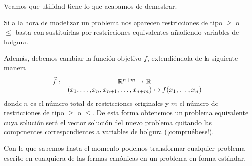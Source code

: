 Veamos que utilidad tiene lo que acabamos de demostrar.
\begin{obs}[Aplicación]
	Si a la hora de modelizar un problema nos aparecen restricciones de tipo $\geq$ o $\leq$ basta con sustituirlas por restricciones equivalentes añadiendo variables de holgura.
	
	Además, debemos cambiar la función objetivo $f$, extendiéndola de la siguiente manera
	\begin{equation*}
		\begin{array}{cc}
		\widehat{f}:&\mathbb{R}^{n+m}\to \mathbb{R}\\
		& (x_1,\dots,x_n,x_{n+1},\dots,x_{n+m})\mapsto f(x_1,\dots,x_n)
		\end{array}
	\end{equation*}
	donde $n$ es el número total de restricciones originales y $m$ el número de restricciones de tipo $\geq$ o $\leq$. De esta forma obtenemos un problema equivalente cuya solución será el vector solución del nuevo problema quitando las componentes correspondientes a variables de holgura (¡compruébese!).
\end{obs}
Con lo que sabemos hasta el momento podemos transformar cualquier problema escrito en cualquiera de las formas canónicas en un problema en forma estándar.
